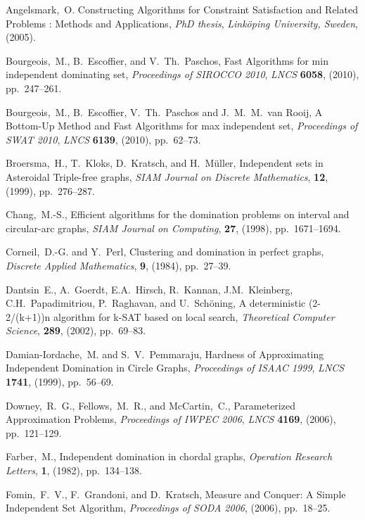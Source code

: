 \documentclass[a4paper,10pt]{article}
\theoremstyle{plain}
\theoremstyle{definition}
\theoremstyle{remark}
\begin{document}
\begin{thebibliography}{99}





Angelsmark,~O.
Constructing Algorithms for Constraint Satisfaction and Related Problems : Methods and Applications,
{\em PhD thesis\/}, {\em Link\"oping University, Sweden}, (2005).

Bourgeois,~M., B.~Escoffier, and V.~Th.~Paschos,
Fast Algorithms for min independent dominating set,
{\em Proceedings of SIROCCO 2010\/}, {\em LNCS}
{\bf 6058}, (2010), pp.~247--261.

Bourgeois,~M., B.~Escoffier, V.~Th.~Paschos and J.~M.~M.~van Rooij,
A Bottom-Up Method and Fast Algorithms for max independent set,
{\em Proceedings of SWAT 2010\/}, {\em LNCS}
{\bf 6139}, (2010), pp.~62--73.

Broersma,~H., T.~Kloks, D.~Kratsch, and H.~M\"uller,
Independent sets in Asteroidal Triple-free graphs,
{\em SIAM Journal on Discrete Mathematics\/},
{\bf 12}, (1999), pp.~276--287.

Chang,~M.-S.,
Efficient algorithms for the domination problems on interval and circular-arc graphs,
{\em SIAM Journal on Computing\/},
{\bf 27}, (1998), pp.~1671--1694.

Corneil,~D.-G. and Y.~Perl,
Clustering and domination in perfect graphs,
{\em Discrete Applied Mathematics\/},
{\bf 9}, (1984), pp.~27--39.


Dantsin~E., A.~Goerdt, E.A.~Hirsch, R.~Kannan, J.M.~Kleinberg, C.H.~Papadimitriou,
P.~Raghavan, and U.~Schöning,
A deterministic (2-2/(k+1))n algorithm for k-SAT based on local search,
{\em Theoretical Computer Science\/},
{\bf 289}, (2002), pp.~69--83.

Damian-Iordache,~M. and S.~V.~Pemmaraju,
Hardness of Approximating Independent Domination in Circle Graphs,
{\em Proceedings of ISAAC 1999\/}, {\em LNCS}
{\bf 1741}, (1999), pp.~56--69.

Downey,~R.~G., Fellows,~M.~R., and McCartin,~C.,
Parameterized Approximation Problems,
{\em Proceedings of IWPEC 2006\/}, {\em LNCS\/}
{\bf 4169}, (2006), pp.~121--129.

Farber,~M.,
Independent domination in chordal graphs,
{\em Operation Research Letters\/},
{\bf 1}, (1982), pp.~134--138.

Fomin,~F.~V., F.~Grandoni, and D.~Kratsch,
Measure and Conquer: A Simple  Independent Set Algorithm,
{\em Proceedings of SODA 2006\/}, (2006), pp.~18--25.


\end{thebibliography}
\end{document}
